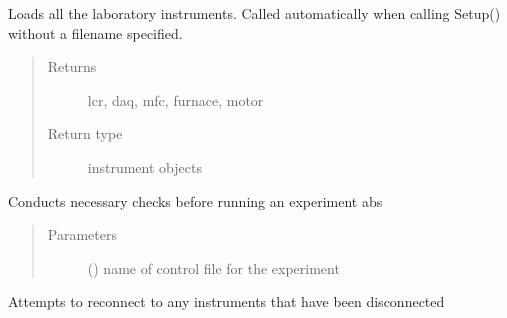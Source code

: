 \documentclass[letterpaper,10pt,english]{sphinxmanual}
\begin{document}
\begin{fulllineitems}
\begin{fulllineitems}
\end{fulllineitems}


\begin{fulllineitems}
\label{\detokenize{laboratory:laboratory.Setup.load_instruments}}
Loads all the laboratory instruments. Called automatically when calling Setup() without a filename specified.
\begin{quote}\begin{description}
\item[{Returns}] \leavevmode
lcr, daq, mfc, furnace, motor

\item[{Return type}] \leavevmode
instrument objects

\end{description}\end{quote}

\end{fulllineitems}


\begin{fulllineitems}
\label{\detokenize{laboratory:laboratory.Setup.preflight_checklist}}
Conducts necessary checks before running an experiment abs
\begin{quote}\begin{description}
\item[{Parameters}] \leavevmode
{} () \textendash{} name of control file for the experiment

\end{description}\end{quote}

\end{fulllineitems}


\begin{fulllineitems}
\label{\detokenize{laboratory:laboratory.Setup.reconnect}}
Attempts to reconnect to any instruments that have been disconnected


\end{fulllineitems}
\end{fulllineitems}
\end{document}
